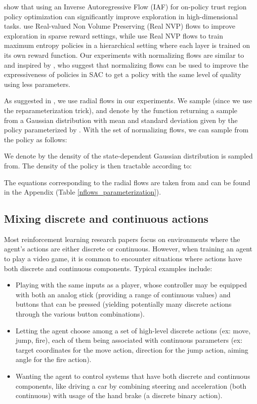 \documentclass[letterpaper]{article} \usepackage{aaai20}  \usepackage{times}  \usepackage{helvet} \usepackage{courier}  \usepackage[hyphens]{url}  \usepackage{graphicx} \urlstyle{rm} \def\UrlFont{\rm}  \usepackage{graphicx}  \usepackage[section]{placeins}
\begin{document}
\cite{normflowsboostingtrpo} show that using an Inverse Autoregressive Flow (IAF) for on-policy trust region policy optimization can significantly improve exploration in high-dimensional tasks. \cite{ward2019improvingflows} use Real-valued Non Volume Preserving (Real NVP) flows to improve exploration in sparse reward settings, while \cite{haarnojaHSAC} use Real NVP flows to train maximum entropy policies in a hierarchical setting where each layer is trained on its own reward function. Our experiments with normalizing flows are similar to and inspired by \cite{mazoure2019leveraging}, who suggest that normalizing flows can be used to improve the expressiveness of policies in SAC to get a policy with the same level of quality using less parameters.  

As suggested in \cite{mazoure2019leveraging}, we use radial flows in our experiments. We sample  (since we use the reparameterization trick), and denote by  the function returning a sample from a Gaussian distribution with mean and standard deviation given by the policy parameterized by . With  the set of normalizing flows, we can sample from the policy as follows:



We denote by  the density of the state-dependent Gaussian distribution  is sampled from. The density of the policy is then tractable according to: 



The equations corresponding to the radial flows are taken from \cite{normalizingflows2015} and can be found in the Appendix (Table \ref{nflows_parameterization}).

\subsection{Mixing discrete and continuous actions}

Most reinforcement learning research papers focus on environments where the agent's actions are either discrete or continuous.
However, when training an agent to play a video game, it is common to encounter situations where actions have both discrete and continuous components.
Typical examples include:
\begin{itemize}
    \item Playing with the same inputs as a player, whose controller may be equipped with both an analog stick (providing a range of continuous values) and buttons that can be pressed (yielding potentially many discrete actions through the various button combinations).
    \item Letting the agent choose among a set of high-level discrete actions (ex: move, jump, fire), each of them being associated with continuous parameters (ex: target coordinates for the move action, direction for the jump action, aiming angle for the fire action).
    \item Wanting the agent to control systems that have both discrete and continuous components, like driving a car by combining steering and acceleration (both continuous) with usage of the hand brake (a discrete binary action).
\end{itemize}
\end{document}
